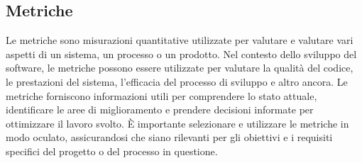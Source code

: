 \vspace{2em}
\subsection*{Metriche}
\par Le metriche sono misurazioni quantitative utilizzate per valutare e valutare vari aspetti di un sistema, un processo o un prodotto. Nel contesto dello sviluppo del software, le metriche possono essere utilizzate per valutare la qualità del codice, le prestazioni del sistema, l'efficacia del processo di sviluppo e altro ancora. Le metriche forniscono informazioni utili per comprendere lo stato attuale, identificare le aree di miglioramento e prendere decisioni informate per ottimizzare il lavoro svolto. È importante selezionare e utilizzare le metriche in modo oculato, assicurandosi che siano rilevanti per gli obiettivi e i requisiti specifici del progetto o del processo in questione.





